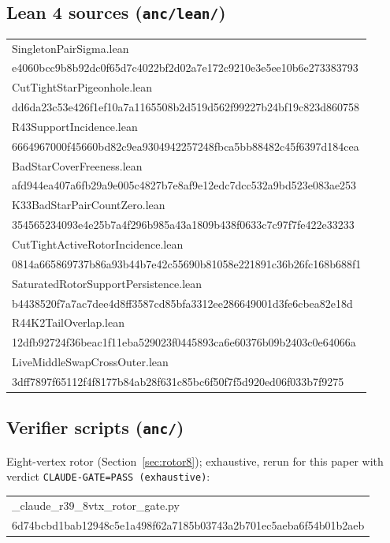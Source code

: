 \documentclass[11pt]{article}
\theoremstyle{definition}
\begin{document}
\subsection*{Lean 4 sources (\texttt{anc/lean/})}

{\small\ttfamily\begin{tabular}{l}
SingletonPairSigma.lean\\
\quad e4060bcc9b8b92dc0f65d7c4022bf2d02a7e172c9210e3e5ee10b6e273383793\\
CutTightStarPigeonhole.lean\\
\quad dd6da23c53e426f1ef10a7a1165508b2d519d562f99227b24bf19c823d860758\\
R43SupportIncidence.lean\\
\quad 6664967000f45660bd82c9ea9304942257248fbca5bb88482c45f6397d184cea\\
BadStarCoverFreeness.lean\\
\quad afd944ea407a6fb29a9e005c4827b7e8af9e12edc7dcc532a9bd523e083ae253\\
K33BadStarPairCountZero.lean\\
\quad 354565234093e4e25b7a4f296b985a43a1809b438f0633c7c97f7fe422e33233\\
CutTightActiveRotorIncidence.lean\\
\quad 0814a665869737b86a93b44b7e42c55690b81058e221891c36b26fc168b688f1\\
SaturatedRotorSupportPersistence.lean\\
\quad b4438520f7a7ac7dee4d8ff3587cd85bfa3312ee286649001d3fe6cbea82e18d\\
R44K2TailOverlap.lean\\
\quad 12dfb92724f36beac1f11eba529023f0445893ca6e60376b09b2403c0e64066a\\
LiveMiddleSwapCrossOuter.lean\\
\quad 3dff7897f65112f4f8177b84ab28f631c85bc6f50f7f5d920ed06f033b7f9275
\end{tabular}}

\subsection*{Verifier scripts (\texttt{anc/})}

Eight-vertex rotor (Section~\ref{sec:rotor8}); exhaustive, rerun for
this paper with verdict \texttt{CLAUDE-GATE=PASS (exhaustive)}:

{\small\ttfamily\begin{tabular}{l}
\_claude\_r39\_8vtx\_rotor\_gate.py\\
\quad 6d74bcbd1bab12948c5e1a498f62a7185b03743a2b701ec5aeba6f54b01b2aeb
\end{tabular}}
\end{document}
